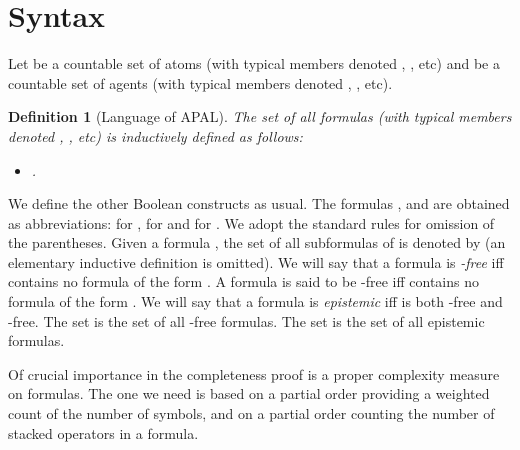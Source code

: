 \documentclass{article}[12pt]
\newtheorem{definition}{Definition}
\begin{document}
\section{Syntax}
Let  be a countable set of atoms (with typical members denoted , , etc) and  be a countable set of agents (with typical members denoted , , etc).

\begin{definition}[Language of APAL]
The set  of all formulas (with typical members denoted , , etc) is inductively defined as follows: 
\begin{itemize}
\item .
\end{itemize}
\end{definition}
We define the other Boolean constructs as usual.
The formulas ,  and  are obtained as abbreviations:  for ,  for  and  for .
We adopt the standard rules for omission of the parentheses.
Given a formula , the set of all subformulas of  is denoted by  (an elementary inductive definition is omitted).
We will say that a formula  is {\em -free} iff  contains no formula of the form .
A formula  is said to be -free iff  contains no formula of the form .
We will say that a formula  is {\em epistemic} iff  is both -free and -free.
The set  is the set of all -free formulas.
The set  is the set of all epistemic formulas.

Of crucial importance in the completeness proof is a proper complexity measure on formulas. The one we need is based on a partial order  providing a weighted count of the number of symbols, and on a partial order  counting the number of stacked  operators in a formula.
\end{document}
